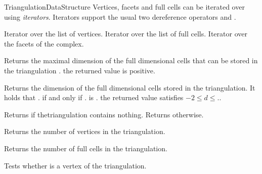 \begin{ccRefConcept}{TriangulationDataStructure}
Vertices, facets and full cells can be iterated over using \emph{iterators}.
Iterators support the usual two dereference operators  and
.

{
Iterator over the list of vertices.
}
\ccGlue
{}
{
Iterator over the list of full cells.
}
\ccGlue
{}
{
Iterator over the facets of the complex.
}

\ccGlue
{}

\ccCreation
{}




 { Returns the maximal dimension of
the full dimensional cells that can be stored in the triangulation \ccVar. \ccPostcond the
returned value is positive. }

 { Returns the dimension of the
full dimensional cells stored in the triangulation. It holds that
\ccVar. if and only if \ccVar. is
. \ccPostcond the returned value  satisfies 
$-2\leq d \leq$\ccVar.. }

 { Returns  if thetriangulation
contains nothing. Returns  otherwise. }

{Returns the number of vertices in the triangulation.}

{Returns the number of full cells  in the triangulation.}

{Tests whether  is a vertex of the triangulation. }


\end{ccRefConcept}
